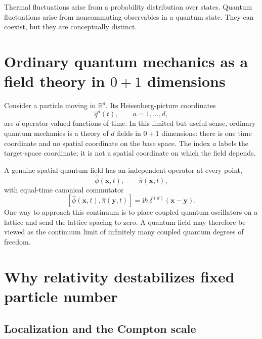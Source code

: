 \documentclass[11pt]{article}
\newcommand{\ii}{\mathrm{i}}
\newcommand{\R}{\mathbb{R}}
\newcommand{\comm}[2]{\left[#1,#2\right]}
\begin{document}
\begin{remarkbox}
Thermal fluctuations arise from a probability distribution over states.
Quantum fluctuations arise from noncommuting observables in a quantum state.
They can coexist, but they are conceptually distinct.
\end{remarkbox}

\section{Ordinary quantum mechanics as a field theory in \texorpdfstring{$0+1$}{0+1} dimensions}

Consider a particle moving in $\R^d$.  Its Heisenberg-picture coordinates
\begin{equation}
  \hat q^a(t),
  \qquad a=1,\ldots,d,
\end{equation}
are $d$ operator-valued functions of time.  In this limited but useful sense,
ordinary quantum mechanics is a theory of $d$ fields in $0+1$ dimensions:
there is one time coordinate and no spatial coordinate on the base space.
The index $a$ labels the target-space coordinate; it is not a spatial
coordinate on which the field depends.

A genuine spatial quantum field has an independent operator at every point,
\begin{equation}
  \hat\phi(\bm x,t),
  \qquad
  \hat\pi(\bm x,t),
\end{equation}
with equal-time canonical commutator
\begin{equation}
  \comm{\hat\phi(\bm x,t)}{\hat\pi(\bm y,t)}
  =\ii\hbar\,\delta^{(d)}(\bm x-\bm y).
  \label{eq:fieldCCR}
\end{equation}
One way to approach this continuum is to place coupled quantum oscillators
on a lattice and send the lattice spacing to zero.  A quantum field may
therefore be viewed as the continuum limit of infinitely many coupled quantum
degrees of freedom.

\section{Why relativity destabilizes fixed particle number}

\subsection{Localization and the Compton scale}
\end{document}
